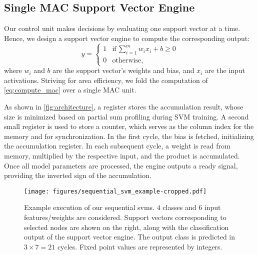 \subsection{Single MAC Support Vector Engine} \label{sec:engine}
Our control unit makes decisions by evaluating one support vector at a time.
Hence, we design a support vector engine to compute the corresponding output:
\begin{equation}
    y = \begin{cases}
        1 & \text{if}\, \sum_{i=1}^{m} w_i x_i + b \geq 0 \\
        0 & \text{otherwise,}
    \end{cases}
\label{eq:compute_mac}
\end{equation}
where $w_i$ and $b$ are the support vector's weights and bias, and $x_i$ are the input activations.
Striving for area efficiency, we fold the computation of \eqref{eq:compute_mac} over a single MAC unit.

As shown in \cref{fig:architecture}, a register stores the accumulation result, whose size is minimized based on partial sum profiling during SVM training.
A second small register is used to store a counter, which serves as the column index for the memory and for synchronization.
In the first cycle, the bias is fetched, initializing the accumulation register.
In each subsequent cycle, a weight is read from memory, multiplied by the respective input, and the product is accumulated.
Once all model parameters are processed, the engine outputs a ready signal, providing the inverted sign of the accumulation.

\begin{figure}[!t]
    \centering
    \texttt{[image: figures/sequential\_svm\_example-cropped.pdf]}
    \caption{Example execution of our sequential \glspl{svm}. $4$ classes and $6$ input features/weights are considered. Support vectors corresponding to selected nodes are shown on the right, along with the classification output of the support vector engine. The output class is predicted in $3\times 7=21$ cycles. Fixed point values are represented by integers.
    }
    \label{fig:example}\vspace{-4ex}
\end{figure}


